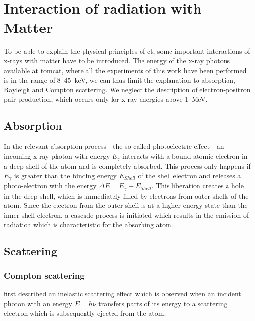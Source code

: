 \section{Interaction of radiation with Matter}
To be able to explain the physical principles of \ac{ct}, some important interactions of x-rays with matter have to be introduced. The energy of the x-ray photons available at \ac{tomcat}, where all the experiments of this work have been performed is in the range of 8--\SI{45}{\kilo\electronvolt}, we can thus limit the explanation to absorption, Rayleigh and Compton scattering. We neglect the description of electron-positron pair production, which occurs only for x-ray energies above \SI{1}{\mega\electronvolt}.

\subsection{Absorption}\label{sec:absorption}
In the relevant absorption process---the so-called photoelectric effect---an incoming x-ray photon with energy $E_{\gamma}$ interacts with a bound atomic electron in a deep shell of the atom and is completely absorbed. This process only happens if $E_{\gamma}$ is greater than the binding energy $E_{Shell}$ of the shell electron and releases a photo-electron with the energy $\Delta E=E_{\gamma}-E_{Shell}$. This liberation creates a hole in the deep shell, which is immediately filled by electrons from outer shells of the atom. Since the electron from the outer shell is at a higher energy state than the inner shell electron, a cascade process is initiated which results in the emission of radiation which is characteristic for the absorbing atom.

\subsection{Scattering}
\subsubsection{Compton scattering}
\citet{Compton1923} first described an inelastic scattering effect which is observed when an incident photon with an energy $E=h\nu$ transfers parts of its energy to a scattering electron which is subsequently ejected from the atom.

